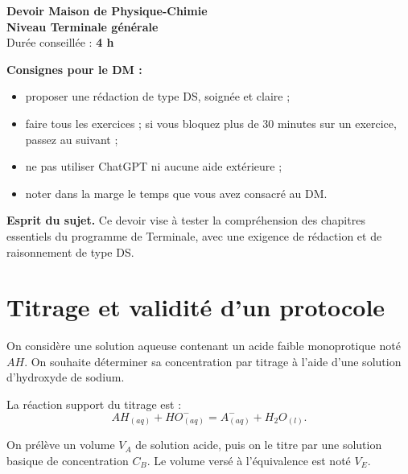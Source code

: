 \documentclass[11pt,a4paper]{article}
\begin{document}
\begin{center}
    {\LARGE \textbf{Devoir Maison de Physique-Chimie}}\\[0.3em]
    {\large \textbf{Niveau Terminale générale}}\\[0.3em]
    Durée conseillée : \textbf{4 h}
\end{center}

\begin{consignesbox}
\textbf{Consignes pour le DM :}
\begin{itemize}[leftmargin=1.2cm]
    \item proposer une rédaction de type DS, soignée et claire ;
    \item faire tous les exercices ; si vous bloquez plus de 30 minutes sur un exercice, passez au suivant ;
    \item ne pas utiliser ChatGPT ni aucune aide extérieure ;
    \item noter dans la marge le temps que vous avez consacré au DM.
\end{itemize}
\end{consignesbox}

\begin{objectifbox}
\textbf{Esprit du sujet.}  
Ce devoir vise à tester la compréhension des chapitres essentiels du programme de Terminale, avec une exigence de rédaction et de raisonnement de type DS.
\end{objectifbox}

\section{Titrage et validité d’un protocole}

On considère une solution aqueuse contenant un acide faible monoprotique noté \(AH\).  
On souhaite déterminer sa concentration par titrage à l’aide d’une solution d’hydroxyde de sodium.

La réaction support du titrage est :
\[
AH_{(aq)} + HO^-_{(aq)} = A^-_{(aq)} + H_2O_{(l)}.
\]

On prélève un volume \(V_A\) de solution acide, puis on le titre par une solution basique de concentration \(C_B\). Le volume versé à l’équivalence est noté \(V_E\).
\end{document}
